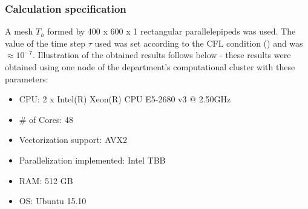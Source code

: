 \subsubsection{Calculation specification}
A mesh $T_h$ formed by 400 x 600 x 1 rectangular parallelepipeds was used.
The value of the time step $\tau$ used was set according to the CFL condition () and was $\approx 10^{-7}$.
Illustration of the obtained results follows below - these results were obtained using one node of the department's computational cluster with these parameters:
\begin{itemize}
    \item CPU: 2 x Intel(R) Xeon(R) CPU E5-2680 v3 @ 2.50GHz
    \item \# of Cores: 48
    \item Vectorization support: AVX2
    \item Parallelization implemented: Intel TBB
    \item RAM: 512 GB
    \item OS: Ubuntu 15.10
\end{itemize}

